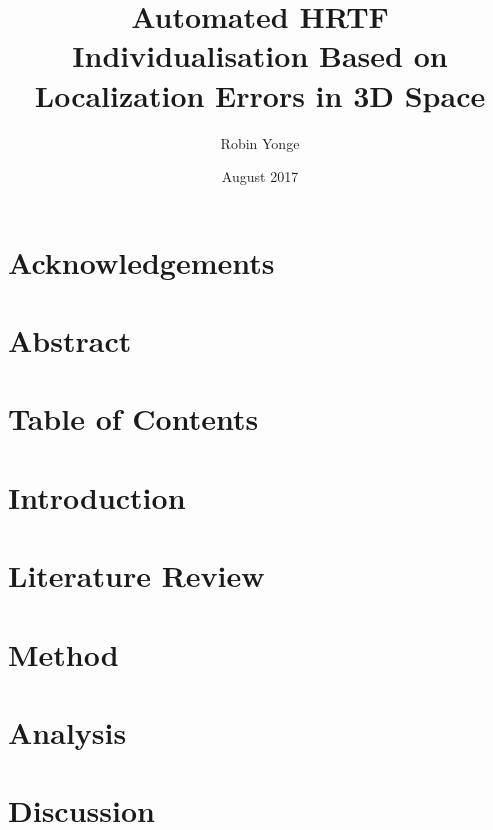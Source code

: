 \documentclass[12pt, a4paper, titlepage, draft]{report}
\begin{document}
\title{Automated HRTF Individualisation Based on Localization Errors in 3D Space}
\author{Robin Yonge}
\date{August 2017}
\maketitle

\section{Acknowledgements}

\section{Abstract}


\section{Table of Contents}

\section{Introduction}


\section{Literature Review}


\section{Method}


\section{Analysis}


\section{Discussion}





\end{document}
